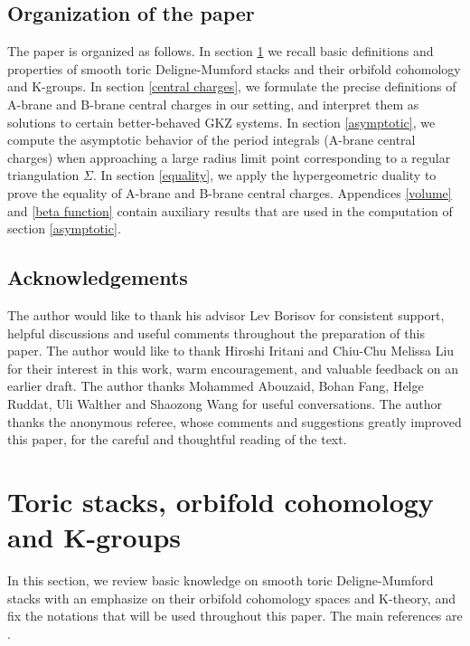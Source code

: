 \documentclass[11pt,reqno]{amsart}
\theoremstyle{definition}
\numberwithin{equation}{section}
\begin{document}
\subsection{Organization of the paper}
The paper is organized as follows. In section \ref{preliminary} we recall basic definitions and properties of smooth toric Deligne-Mumford stacks and their orbifold cohomology and K-groups. In section \ref{central charges}, we formulate the precise definitions of A-brane and B-brane central charges in our setting, and interpret them as solutions to certain better-behaved GKZ systems. In section \ref{asymptotic}, we compute the asymptotic behavior of the period integrals (A-brane central charges) when approaching a large radius limit point corresponding to a regular triangulation $\Sigma$. In section \ref{equality}, we apply the hypergeometric duality to prove the equality of A-brane and B-brane central charges. Appendices \ref{volume} and \ref{beta function} contain auxiliary results that are used in the computation of section \ref{asymptotic}. 

\subsection{Acknowledgements}

The author would like to thank his advisor Lev Borisov for consistent support, helpful discussions and useful comments throughout the preparation of this paper. The author would like to thank Hiroshi Iritani and Chiu-Chu Melissa Liu for their interest in this work, warm encouragement, and valuable feedback on an earlier draft. The author thanks Mohammed Abouzaid, Bohan Fang, Helge Ruddat, Uli Walther and Shaozong Wang for useful conversations. The author thanks the anonymous referee, whose comments and suggestions greatly improved this paper, for the careful and thoughtful reading of the text.

\section{Toric stacks, orbifold cohomology and K-groups}\label{preliminary}

In this section, we review basic knowledge on smooth toric Deligne-Mumford stacks with an emphasize on their orbifold cohomology spaces and K-theory, and fix the notations that will be used throughout this paper. The main references are \cite{BCS, BHconj, BHanDuality}.
\end{document}
